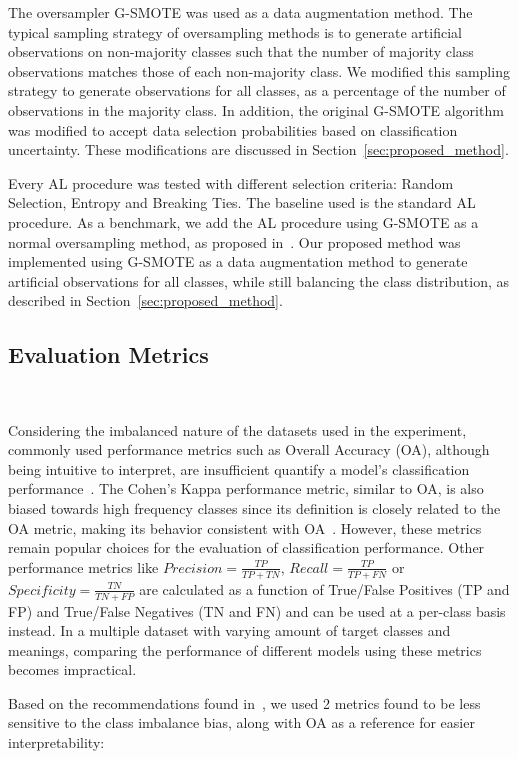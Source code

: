 \documentclass[parskip=full]{scrartcl}
\begin{document}
The oversampler G-SMOTE was used as a data augmentation method. The typical
sampling strategy of oversampling methods is to generate artificial
observations on non-majority classes such that the number of majority class
observations matches those of each non-majority class. We modified this
sampling strategy to generate observations for all classes, as a percentage of
the number of observations in the majority class. In addition, the original
G-SMOTE algorithm was modified to accept data selection probabilities based on
classification uncertainty. These modifications are discussed in
Section~\ref{sec:proposed_method}.

Every AL procedure was tested with different selection criteria: Random
Selection, Entropy and Breaking Ties. The baseline used is the standard AL
procedure. As a benchmark, we add the AL procedure using G-SMOTE as a normal
oversampling method, as proposed in~\cite{Fonseca2021}. Our proposed method
was implemented using G-SMOTE as a data augmentation method to generate
artificial observations for all classes, while still balancing the class
distribution, as described in Section~\ref{sec:proposed_method}. 

\subsection{Evaluation Metrics}~\label{sec:evaluation_metrics}

Considering the imbalanced nature of the datasets used in the experiment,
commonly used performance metrics such as Overall Accuracy (OA), although
being intuitive to interpret, are insufficient quantify a model's
classification performance~\cite{Jeni2013}. The Cohen's Kappa performance
metric, similar to OA, is also biased towards high frequency classes since its
definition is closely related to the OA metric, making its behavior consistent
with OA~\cite{Fatourechi2008}. However, these metrics remain popular choices
for the evaluation of classification performance. Other performance metrics
like $Precision = \frac{TP}{TP+TN}$, $Recall = \frac{TP}{TP+FN}$ or
$Specificity = \frac{TN}{TN + FP}$ are calculated as a function of True/False
Positives (TP and FP) and True/False Negatives (TN and FN) and can be used at
a per-class basis instead. In a multiple dataset with varying amount of target
classes and meanings, comparing the performance of different models using
these metrics becomes impractical.

Based on the recommendations found in~\cite{Jeni2013, Kubat1997}, we used 2
metrics found to be less sensitive to the class imbalance bias, along with OA
as a reference for easier interpretability:
\end{document}
